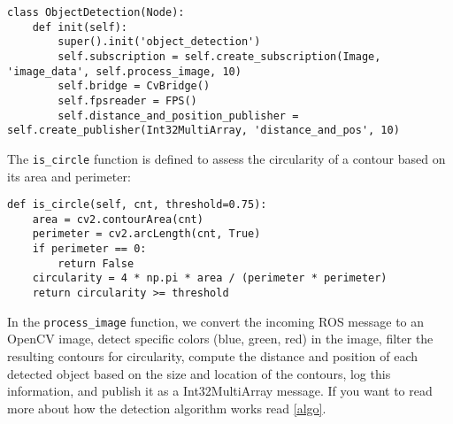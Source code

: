 \begin{lstlisting}[language=PythonPlus]
class ObjectDetection(Node):
    def init(self):
        super().init('object_detection')
        self.subscription = self.create_subscription(Image, 'image_data', self.process_image, 10)
        self.bridge = CvBridge()
        self.fpsreader = FPS()
        self.distance_and_position_publisher = self.create_publisher(Int32MultiArray, 'distance_and_pos', 10)
\end{lstlisting}

The \verb|is_circle| function is defined to assess the circularity of a contour based on its area and perimeter:

\begin{lstlisting}[language=PythonPlus]
def is_circle(self, cnt, threshold=0.75):
    area = cv2.contourArea(cnt)
    perimeter = cv2.arcLength(cnt, True)
    if perimeter == 0:
        return False
    circularity = 4 * np.pi * area / (perimeter * perimeter)
    return circularity >= threshold
\end{lstlisting}

In the \verb|process_image| function, we convert the incoming ROS message to an OpenCV image, detect specific colors (blue, green, red) in the image, filter the resulting contours for circularity, compute the distance and position of each detected object based on the size and location of the contours, log this information, and publish it as a Int32MultiArray message. If you want to read more about how the detection algorithm works read \ref{algo}.

